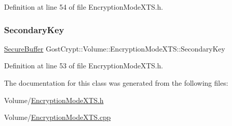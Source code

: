 Definition at line 54 of file Encryption\+Mode\+X\+T\+S.\+h.

\mbox{\label{class_gost_crypt_1_1_volume_1_1_encryption_mode_x_t_s_afcdb3374f093c1bb21f5def339769c5e}} 
\subsubsection{\texorpdfstring{Secondary\+Key}{SecondaryKey}}
{\footnotesize\ttfamily \hyperlink{class_gost_crypt_1_1_secure_buffer}{Secure\+Buffer} Gost\+Crypt\+::\+Volume\+::\+Encryption\+Mode\+X\+T\+S\+::\+Secondary\+Key\hspace{0.3cm}{\ttfamily [protected]}}



Definition at line 53 of file Encryption\+Mode\+X\+T\+S.\+h.



The documentation for this class was generated from the following files\+:\begin{DoxyCompactItemize}
\item 
Volume/\hyperlink{_encryption_mode_x_t_s_8h}{Encryption\+Mode\+X\+T\+S.\+h}\item 
Volume/\hyperlink{_encryption_mode_x_t_s_8cpp}{Encryption\+Mode\+X\+T\+S.\+cpp}\end{DoxyCompactItemize}

